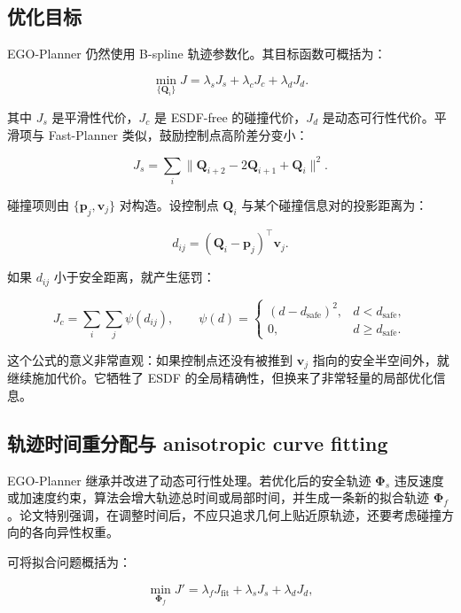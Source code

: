 \documentclass[UTF8,a4paper,12pt]{ctexart}
\newcommand{\traj}{\boldsymbol{\Phi}}
\newcommand{\ctrl}{\mathbf{Q}}
\newcommand{\pos}{\mathbf{p}}
\newcommand{\dist}{d_{\mathrm{safe}}}
\begin{document}
\subsection{优化目标}

EGO-Planner 仍然使用 B-spline 轨迹参数化。其目标函数可概括为：

\begin{equation}
  \min_{\{\ctrl_i\}} J
  =\lambda_s J_s+\lambda_c J_c+\lambda_d J_d .
\end{equation}

其中 $J_s$ 是平滑性代价，$J_c$ 是 ESDF-free 的碰撞代价，$J_d$ 是动态可行性代价。平滑项与 Fast-Planner 类似，鼓励控制点高阶差分变小：

\begin{equation}
  J_s=\sum_i \|\ctrl_{i+2}-2\ctrl_{i+1}+\ctrl_i\|^2.
\end{equation}

碰撞项则由 $\{\pos_j,\mathbf{v}_j\}$ 对构造。设控制点 $\ctrl_i$ 与某个碰撞信息对的投影距离为：

\begin{equation}
  d_{ij}=(\ctrl_i-\pos_j)^\top \mathbf{v}_j .
\end{equation}

如果 $d_{ij}$ 小于安全距离，就产生惩罚：

\begin{equation}
  J_c=\sum_i \sum_j \psi(d_{ij}), \qquad
  \psi(d)=
  \begin{cases}
  (d-\dist)^2, & d<\dist,\\
  0, & d\ge \dist .
  \end{cases}
\end{equation}

这个公式的意义非常直观：如果控制点还没有被推到 $\mathbf{v}_j$ 指向的安全半空间外，就继续施加代价。它牺牲了 ESDF 的全局精确性，但换来了非常轻量的局部优化信息。

\subsection{轨迹时间重分配与 anisotropic curve fitting}

EGO-Planner 继承并改进了动态可行性处理。若优化后的安全轨迹 $\traj_s$ 违反速度或加速度约束，算法会增大轨迹总时间或局部时间，并生成一条新的拟合轨迹 $\traj_f$。论文特别强调，在调整时间后，不应只追求几何上贴近原轨迹，还要考虑碰撞方向的各向异性权重。

可将拟合问题概括为：

\begin{equation}
  \min_{\traj_f}
  J'=\lambda_f J_{\mathrm{fit}}+\lambda_s J_s+\lambda_d J_d ,
\end{equation}
\end{document}
